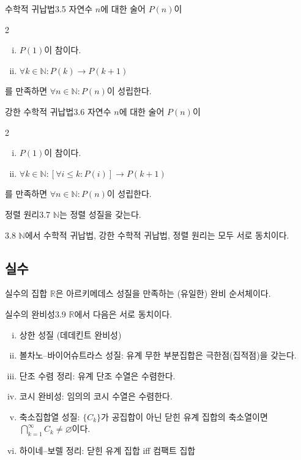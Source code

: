 \documentclass{article}
\begin{document}
\begin{thm}{수학적 귀납법}{3.5}
    자연수 $n$에 대한 술어 $P(n)$이
    \begin{multicols}{2}
        \begin{enumerate}[(i)]
            \item $P(1)$이 참이다.
            \item $\forall k\in\mathbb N:P(k)\longrightarrow P(k+1)$
        \end{enumerate}
    \end{multicols}
    를 만족하면 $\forall n\in\mathbb N:P(n)$이 성립한다.
\end{thm}

\begin{thm}{강한 수학적 귀납법}{3.6}
    자연수 $n$에 대한 술어 $P(n)$이
    \begin{multicols}{2}
        \begin{enumerate}[(i)]
            \item $P(1)$이 참이다.
            \item $\forall k\in\mathbb N:[\forall i\leq k:P(i)]\longrightarrow P(k+1)$
        \end{enumerate}
    \end{multicols}
    를 만족하면 $\forall n\in\mathbb N:P(n)$이 성립한다.
\end{thm}

\begin{thm}{정렬 원리}{3.7}
    $\mathbb N$는 정렬 성질을 갖는다.
\end{thm}

\begin{thm}{}{3.8}
    $\mathbb N$에서 수학적 귀납법, 강한 수학적 귀납법, 정렬 원리는 모두 서로 동치이다.
\end{thm}

\subsection{실수}
실수의 집합 $\mathbb R$은 아르키메데스 성질을 만족하는 (유일한) 완비 순서체이다.

\begin{thm}{실수의 완비성}{3.9}
    $\mathbb R$에서 다음은 서로 동치이다.
    \begin{enumerate}[(i)]
        \item 상한 성질 (데데킨트 완비성)
        \item 볼차노--바이어슈트라스 성질: 유계 무한 부분집합은 극한점(집적점)을 갖는다.
        \item 단조 수렴 정리: 유계 단조 수열은 수렴한다.
        \item 코시 완비성: 임의의 코시 수열은 수렴한다.
        \item 축소집합열 성질: $\{C_k\}$가 공집합이 아닌 닫힌 유계 집합의 축소열이면 $\bigcap_{k=1}^\infty C_k\ne\varnothing$이다.
        \item 하이네--보렐 정리: 닫힌 유계 집합 iff 컴팩트 집합
    \end{enumerate}
\end{thm}
\end{document}
